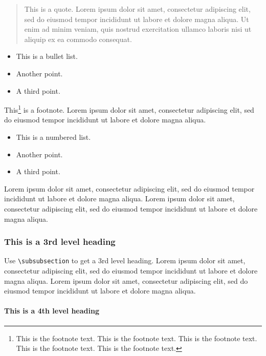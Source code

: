\documentclass[a4paper,alpha-refs]{aejstyles}
\begin{document}
\begin{quote}
This is a quote. Lorem ipsum dolor sit amet, consectetur adipiscing elit, sed do eiusmod tempor incididunt ut labore et dolore magna aliqua. Ut enim ad minim veniam, quis nostrud exercitation ullamco laboris nisi ut aliquip ex ea commodo consequat. 
\end{quote}

\begin{itemize}
\item This is a bullet list.
\item Another point.
\item A third point.
\end{itemize}

This\footnote{This is the footnote text. This is the footnote text. This is the footnote text. This is the footnote text. This is the footnote text.} is a footnote. Lorem ipsum dolor sit amet, consectetur adipiscing elit, sed do eiusmod tempor incididunt ut labore et dolore magna aliqua.

\begin{itemize}
\item This is a numbered list.
\item Another point.
\item A third point.
\end{itemize}

Lorem ipsum dolor sit amet, consectetur adipiscing elit, sed do eiusmod tempor incididunt ut labore et dolore magna aliqua. Lorem ipsum dolor sit amet, consectetur adipiscing elit, sed do eiusmod tempor incididunt ut labore et dolore magna aliqua.


\subsubsection{This is a 3rd level heading}

Use \verb|\subsubsection| to get a 3rd level heading.
Lorem ipsum dolor sit amet, consectetur adipiscing elit, sed do eiusmod tempor incididunt ut labore et dolore magna aliqua. Lorem ipsum dolor sit amet, consectetur adipiscing elit, sed do eiusmod tempor incididunt ut labore et dolore magna aliqua. 


\paragraph{This is a 4th level heading}
\end{document}
